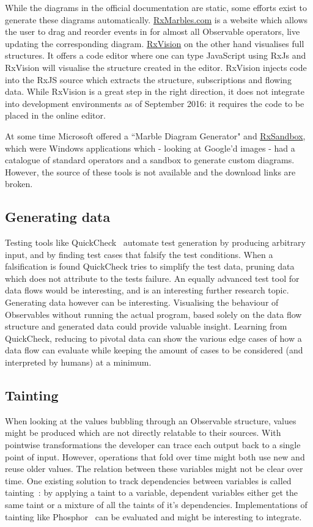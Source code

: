 While the diagrams in the official documentation are static, some
efforts exist to generate these diagrams automatically.  \href{http://RxMarbles.com}
{RxMarbles.com} is a website which allows the user to drag and reorder
events in for almost all Observable operators, live updating the
corresponding diagram.  \href{https://github.com/jaredly/rxvision}{RxVision}
on the other hand visualises full structures.  It offers a code editor
where one can type JavaScript using RxJs and RxVision will visualise the
structure created in the editor.  RxVision injects code into the RxJS
source which extracts the structure, subscriptions and flowing data.
While RxVision is a great step in the right direction, it does not
integrate into development environments as of September 2016:  it
requires the code to be placed in the online editor.

At some time Microsoft offered a ``Marble Diagram Generator" and \href{http://mnajder.blogspot.nl/2010/03/rxsandbox-v1.html}
{RxSandbox}, which were Windows applications which - looking at Google'd
images - had a catalogue of standard operators and a sandbox to generate
custom diagrams.  However, the source of these tools is not available
and the download links are broken.

\subsection{Generating data}%
\label{sec:gen-data} Testing tools like QuickCheck~\cite{quickcheck}
automate test generation by producing arbitrary input, and by finding
test cases that falsify the test conditions.  When a falsification is
found QuickCheck tries to simplify the test data, pruning data which
does not attribute to the tests failure.  An equally advanced test tool
for data flows would be interesting, and is an interesting further
research topic.  Generating data however can be interesting.
Visualising the behaviour of Observables without running the actual
program, based solely on the data flow structure and generated data
could provide valuable insight.  Learning from QuickCheck, reducing to
pivotal data can show the various edge cases of how a data flow can
evaluate while keeping the amount of cases to be considered (and
interpreted by humans) at a minimum.

\subsection{Tainting}%
When looking at the values bubbling through an Observable structure,
values might be produced which are not directly relatable to their
sources.  With pointwise transformations the developer can trace each
output back to a single point of input.  However, operations that fold
over time might both use new and reuse older values.  The relation
between these variables might not be clear over time.  One existing
solution to track dependencies between variables is called tainting~\cite
{bell2015dynamic}:  by applying a taint to a variable, dependent
variables either get the same taint or a mixture of all the taints of
it's dependencies.  Implementations of tainting like Phosphor~\cite{bell2014phosphor}
can be evaluated and might be interesting to integrate.

